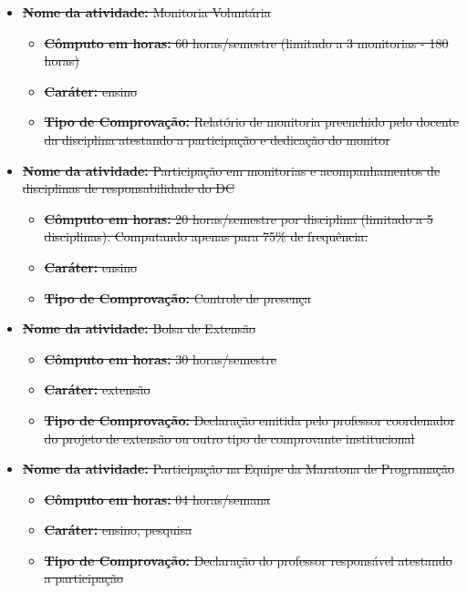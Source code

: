 \begin{itemize}
\item \sout{{\bf Nome da atividade:} Monitoria Voluntária}
\begin{itemize}
\item \sout{{\bf Cômputo em horas:} 60 horas/semestre (limitado a 3 monitorias - 180 horas)}
\item \sout{{\bf Caráter:} ensino}
\item \sout{{\bf Tipo de Comprovação:} Relatório de monitoria preenchido pelo docente da disciplina atestando a participação e dedicação do monitor}
\end{itemize}
\end{itemize}

\begin{itemize}
\item  \sout{{\bf Nome da atividade:} Participação em monitorias e acompanhamentos de disciplinas de responsabilidade do DC}
\begin{itemize}
\item \sout{{\bf Cômputo em horas:} 20 horas/semestre por disciplina (limitado a 5 disciplinas). Computando apenas para 75\% de frequência.}
\item \sout{{\bf Caráter:} ensino}
\item \sout{{\bf Tipo de Comprovação:} Controle de presença}
\end{itemize}
\end{itemize}

\begin{itemize}
\item \sout{{\bf Nome da atividade:} Bolsa de Extensão}
\begin{itemize}
\item \sout{{\bf Cômputo em horas:} 30 horas/semestre}
\item \sout{{\bf Caráter:} extensão}
\item \sout{{\bf Tipo de Comprovação:} Declaração emitida pelo professor coordenador do projeto de extensão ou outro tipo de comprovante institucional}
\end{itemize}
\end{itemize}

\begin{itemize}
\item \sout{{\bf Nome da atividade:} Participação na Equipe da Maratona de Programação}
\begin{itemize}
\item \sout{{\bf Cômputo em horas:} 04 horas/semana}
\item \sout{{\bf Caráter:} ensino, pesquisa}
\item \sout{{\bf Tipo de Comprovação:} Declaração do professor responsável atestando a participação}
\end{itemize}
\end{itemize}


